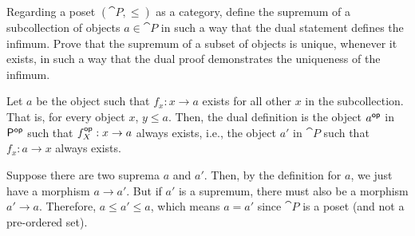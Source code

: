 \documentclass[notes,tikz]{agony}
\begin{document}
\begin{xca}
  Regarding a poset $(\cat P, \leq)$ as a category,
  define the supremum of a subcollection of objects $a \in \cat P$
  in such a way that the dual statement defines the infimum.
  Prove that the supremum of a subset of objects is unique, whenever it exists,
  in such a way that the dual proof demonstrates the uniqueness of the infimum.
\end{xca}
\begin{prf}
  Let $a$ be the object such that $f_x : x \to a$ exists for all other $x$ in the subcollection.
  That is, for every object $x$, $y \leq a$.
  Then, the dual definition is the object $a^{\mathsf{op}}$ in $\mathsf{P}^{\mathsf{op}}$
  such that $f^{\mathsf{op}}_X : x \to a$ always exists, i.e.,
  the object $a'$ in $\cat P$ such that $f_x : a \to x$ always exists.

  Suppose there are two suprema $a$ and $a'$.
  Then, by the definition for $a$, we just have a morphism $a \to a'$.
  But if $a'$ is a supremum, there must also be a morphism $a' \to a$.
  Therefore, $a \leq a' \leq a$, which means $a = a'$ since $\cat P$ is a poset
  (and not a pre-ordered set).
\end{prf}
\end{document}
